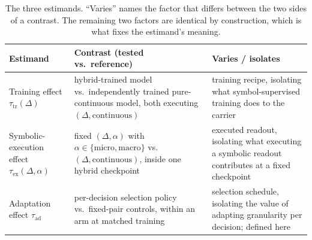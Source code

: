 \begin{table}[t]
\centering
\caption{The three estimands. ``Varies'' names the factor that differs between the two sides of a contrast. The remaining two factors are identical by construction, which is what fixes the estimand's meaning.}
\label{tab:app:estimands}
\small
\begin{tabular}{@{}p{2.9cm}p{4.6cm}p{4.2cm}@{}}
\toprule
Estimand & Contrast (tested vs.\ reference) & Varies / isolates \\
\midrule
Training effect $\tau_{\mathrm{tr}}(\Delta)$ & hybrid-trained model vs.\ independently trained pure-continuous model, both executing $(\Delta, \mathrm{continuous})$ & training recipe, isolating what symbol-supervised training does to the carrier \\
\addlinespace
Symbolic-execution effect $\tau_{\mathrm{ex}}(\Delta, \alpha)$ & fixed $(\Delta, \alpha)$ with $\alpha \in \{\mathrm{micro}, \mathrm{macro}\}$ vs.\ $(\Delta, \mathrm{continuous})$, inside one hybrid checkpoint & executed readout, isolating what executing a symbolic readout contributes at a fixed checkpoint \\
\addlinespace
Adaptation effect $\tau_{\mathrm{ad}}$ & per-decision selection policy vs.\ fixed-pair controls, within an arm at matched training & selection schedule, isolating the value of adapting granularity per decision; defined here \\
\bottomrule
\end{tabular}
\end{table}

